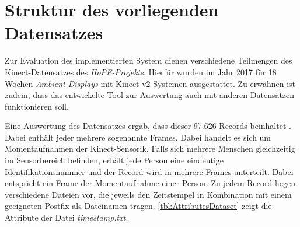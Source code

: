 \section{Struktur des vorliegenden Datensatzes}
\label{2-StrukturDatensatz}
Zur Evaluation des implementierten System dienen verschiedene Teilmengen des Kinect-Datensatzes des \emph{HoPE-Projekts}.
Hierfür wurden im Jahr 2017 für 18 Wochen \emph{Ambient Displays} mit Kinect v2 Systemen ausgestattet.
Zu erwähnen ist zudem, dass das entwickelte Tool zur Auswertung auch mit anderen Datensätzen funktionieren soll.

Eine Auswertung des Datensatzes ergab, dass dieser 97.626 Records beinhaltet \citep{temiz_konzeption_2022}.
Dabei enthält jeder mehrere sogenannte Frames.
Dabei handelt es sich um Momentaufnahmen der Kinect-Sensorik.
Falls sich mehrere Menschen gleichzeitig im Sensorbereich befinden,
erhält jede Person eine eindeutige Identifikationsnummer
und der Record wird in mehrere Frames unterteilt.
Dabei entspricht ein Frame der Momentaufnahme einer Person.
Zu jedem Record liegen verschiedene Dateien vor,
die jeweils den Zeitstempel in Kombination mit einem geeigneten Postfix als Dateinamen tragen.
\autoref{tbl:AttributesDataset} zeigt die Attribute der Datei \emph{timestamp.txt}.

